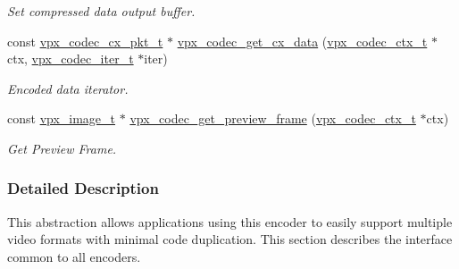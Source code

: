 \begin{DoxyCompactItemize}
\begin{DoxyCompactList}\small\item\em Set compressed data output buffer. \end{DoxyCompactList}\item 
const \hyperlink{group__encoder_ga3f711e17fbefac545e8959ef5a023556}{vpx\-\_\-codec\-\_\-cx\-\_\-pkt\-\_\-t} $\ast$ \hyperlink{group__encoder_gae81cab25d66cf3bc59f1f75f8a5af720}{vpx\-\_\-codec\-\_\-get\-\_\-cx\-\_\-data} (\hyperlink{group__codec_gad03e2dfa6ae511db7d25be6bbb336233}{vpx\-\_\-codec\-\_\-ctx\-\_\-t} $\ast$ctx, \hyperlink{group__codec_ga6ea348f76b1f8a1fe50e14db684146c6}{vpx\-\_\-codec\-\_\-iter\-\_\-t} $\ast$iter)
\begin{DoxyCompactList}\small\item\em Encoded data iterator. \end{DoxyCompactList}\item 
const \hyperlink{vpx__image_8h_abf5ac962cc6d71b4f0e39b1b0d033e55}{vpx\-\_\-image\-\_\-t} $\ast$ \hyperlink{group__encoder_ga250aee4536aa2475e85cf61c9710c963}{vpx\-\_\-codec\-\_\-get\-\_\-preview\-\_\-frame} (\hyperlink{group__codec_gad03e2dfa6ae511db7d25be6bbb336233}{vpx\-\_\-codec\-\_\-ctx\-\_\-t} $\ast$ctx)
\begin{DoxyCompactList}\small\item\em Get Preview Frame. \end{DoxyCompactList}\end{DoxyCompactItemize}


\subsubsection{Detailed Description}
This abstraction allows applications using this encoder to easily support multiple video formats with minimal code duplication. This section describes the interface common to all encoders. 

